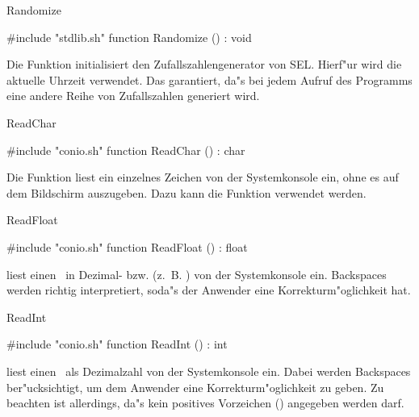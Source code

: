 \newpage

\begin{function}{Randomize}

\syntax
\#include "stdlib.sh"
function Randomize () : void
\endgroup

\usage
Die Funktion  initialisiert den
Zufallszahlengenerator von SEL. Hierf"ur wird die aktuelle
Uhrzeit verwendet. Das garantiert, da"s bei jedem Aufruf des
Programms eine andere Reihe von Zufallszahlen generiert wird.

\fseealso
{}
\end{function}


\begin{function}{ReadChar}

\syntax
\#include "conio.sh"
function ReadChar () : char
\endgroup

\usage
Die Funktion  liest ein einzelnes Zeichen von der
Systemkonsole ein, ohne es auf dem Bildschirm auszugeben. Dazu
kann die Funktion  verwendet werden.

\fseealso
{}
\end{function}


\begin{function}{ReadFloat}

\syntax
\#include "conio.sh"
function ReadFloat () : float
\endgroup

\usage
{} liest einen \tfloat\ in Dezimal- bzw.
 (z.~B. ) von der
Systemkonsole ein. Backspaces werden richtig interpretiert,
soda"s der Anwender eine Korrekturm"oglichkeit hat.

\fseealso
{}
\end{function}


\begin{function}{ReadInt}

\syntax
\#include "conio.sh"
function ReadInt () : int
\endgroup

\usage
{} liest einen \tint\ als Dezimalzahl
von der
Systemkonsole ein. Dabei werden Backspaces ber"ucksichtigt,
um dem Anwender eine Korrekturm"oglichkeit zu geben. Zu beachten
ist allerdings, da"s kein positives Vorzeichen (\fu{+}) angegeben
werden darf.

\fseealso
{}
\end{function}

